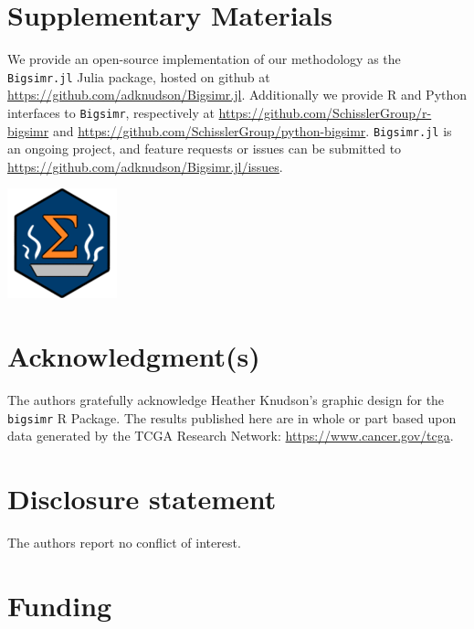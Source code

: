 \documentclass[
]{jss}
\begin{document}
\newpage

\hypertarget{misc}{%
\section*{Supplementary Materials}\label{misc}}

We provide an open-source implementation of our methodology as the
\texttt{Bigsimr.jl} Julia package, hosted on github at
\url{https://github.com/adknudson/Bigsimr.jl}. Additionally we provide R
and Python interfaces to \texttt{Bigsimr}, respectively at
\url{https://github.com/SchisslerGroup/r-bigsimr} and
\url{https://github.com/SchisslerGroup/python-bigsimr}.
\texttt{Bigsimr.jl} is an ongoing project, and feature requests or
issues can be submitted to
\url{https://github.com/adknudson/Bigsimr.jl/issues}.

\begin{CodeChunk}


\begin{center}\includegraphics[width=0.05\linewidth]{images/hex-bigsimr} \end{center}

\end{CodeChunk}

\hypertarget{acknowledgments}{%
\section*{Acknowledgment(s)}\label{acknowledgments}}

The authors gratefully acknowledge Heather Knudson's graphic design for
the \texttt{bigsimr} R Package. The results published here are in whole
or part based upon data generated by the TCGA Research Network:
\url{https://www.cancer.gov/tcga}.

\hypertarget{coi}{%
\section*{Disclosure statement}\label{coi}}

The authors report no conflict of interest.

\hypertarget{funding}{%
\section*{Funding}\label{funding}}
\end{document}
